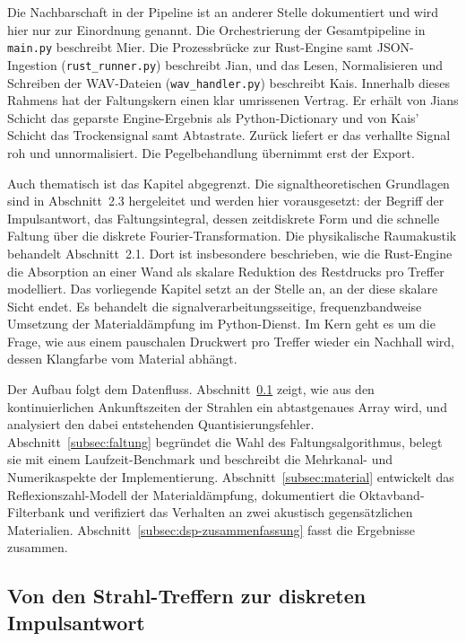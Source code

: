 Die Nachbarschaft in der Pipeline ist an anderer Stelle dokumentiert und wird
hier nur zur Einordnung genannt. Die Orchestrierung der Gesamtpipeline in
\texttt{main.py} beschreibt Mier. Die Prozessbrücke zur Rust-Engine samt
JSON-Ingestion (\texttt{rust\_runner.py}) beschreibt Jian, und das Lesen,
Normalisieren und Schreiben der WAV-Dateien (\texttt{wav\_handler.py})
beschreibt Kais. Innerhalb dieses Rahmens hat der Faltungskern einen klar
umrissenen Vertrag. Er erhält von Jians Schicht das geparste
Engine-Ergebnis als Python-Dictionary und von Kais' Schicht das Trockensignal
samt Abtastrate. Zurück liefert er das verhallte Signal roh und
unnormalisiert. Die Pegelbehandlung übernimmt erst der Export.

Auch thematisch ist das Kapitel abgegrenzt. Die signaltheoretischen Grundlagen
sind in Abschnitt~2.3 hergeleitet und werden hier vorausgesetzt: der Begriff der
Impulsantwort, das Faltungsintegral, dessen zeitdiskrete Form und die schnelle
Faltung über die diskrete Fourier-Transformation. Die physikalische
Raumakustik behandelt Abschnitt~2.1. Dort ist insbesondere beschrieben, wie die
Rust-Engine die Absorption an einer Wand als skalare Reduktion des Restdrucks
pro Treffer modelliert. Das vorliegende Kapitel setzt an der Stelle an, an der
diese skalare Sicht endet. Es behandelt die signalverarbeitungsseitige,
frequenzbandweise Umsetzung der Materialdämpfung im Python-Dienst. Im Kern geht
es um die Frage, wie aus einem pauschalen Druckwert pro Treffer wieder ein
Nachhall wird, dessen Klangfarbe vom Material abhängt.

Der Aufbau folgt dem Datenfluss. Abschnitt~\ref{subsec:build-ir} zeigt, wie aus
den kontinuierlichen Ankunftszeiten der Strahlen ein abtastgenaues Array wird,
und analysiert den dabei entstehenden Quantisierungsfehler.
Abschnitt~\ref{subsec:faltung} begründet die Wahl des Faltungsalgorithmus,
belegt sie mit einem Laufzeit-Benchmark und beschreibt die Mehrkanal- und
Numerikaspekte der Implementierung. Abschnitt~\ref{subsec:material} entwickelt
das Reflexionszahl-Modell der Materialdämpfung, dokumentiert die
Oktavband-Filterbank und verifiziert das Verhalten an zwei akustisch
gegensätzlichen Materialien. Abschnitt~\ref{subsec:dsp-zusammenfassung} fasst
die Ergebnisse zusammen.

\subsection{Von den Strahl-Treffern zur diskreten Impulsantwort}
\label{subsec:build-ir}

